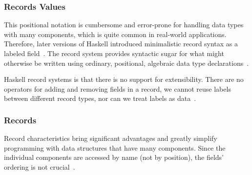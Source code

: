 \begin{frame}\frametitle{Records Values}
    
This positional notation is cumbersome and error-prone for handling data types with many components, which is quite common in real-world applications. Therefore, later versions of Haskell introduced minimalistic record syntax as a labeled field~\cite{lw-ext-records, history-of-haskell}.
The record system provides syntactic sugar for what might otherwise be written using ordinary, positional, algebraic data type declarations~\cite{lw-ext-records}. 

Haskell record systems is that there is no support for extensibility. There are no operators for adding and removing fields in a record, we cannot reuse labels between different record types, nor can we treat labels as data~\cite{poly-ext-records, hlist,lw-ext-records}. 


\end{frame}

\begin{frame}\frametitle{Records}

Record characteristics bring significant advantages and greatly simplify programming with data structures that have many components. Since the individual components are accessed by name (not by position), the fields' ordering is not crucial~\cite{lw-ext-records}.


\end{frame}

